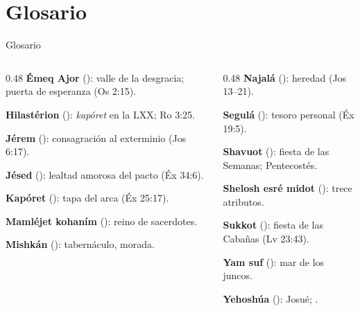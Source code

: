 \section{Glosario}
\begin{frame}{Glosario}
\begin{columns}[T,onlytextwidth]
\begin{column}{0.48\textwidth}\scriptsize
\textbf{Émeq Ajor} (): valle de la desgracia; puerta de esperanza (Os 2:15).\par\medskip
\textbf{Hilastérion} (): \emph{kapóret} en la LXX; Ro 3:25.\par\medskip
\textbf{Jérem} (): consagración al exterminio (Jos 6:17).\par\medskip
\textbf{Jésed} (): lealtad amorosa del pacto (Éx 34:6).\par\medskip
\textbf{Kapóret} (): tapa del arca (Éx 25:17).\par\medskip
\textbf{Mamléjet kohaním} (): reino de sacerdotes.\par\medskip
\textbf{Mishkán} (): tabernáculo, morada.
\end{column}
\begin{column}{0.48\textwidth}\scriptsize
\textbf{Najalá} (): heredad (Jos 13--21).\par\medskip
\textbf{Segulá} (): tesoro personal (Éx 19:5).\par\medskip
\textbf{Shavuot} (): fiesta de las Semanas; Pentecostés.\par\medskip
\textbf{Shelosh esré midot} (): trece atributos.\par\medskip
\textbf{Sukkot} (): fiesta de las Cabañas (Lv 23:43).\par\medskip
\textbf{Yam suf} (): mar de los juncos.\par\medskip
\textbf{Yehoshúa} (): Josué; .
\end{column}
\end{columns}
\end{frame}

